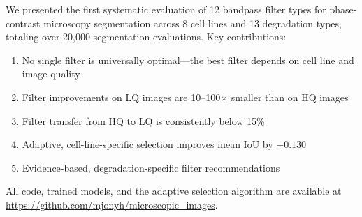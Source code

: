 \documentclass[11pt,a4paper]{article}
\begin{document}
We presented the first systematic evaluation of 12 bandpass filter types for phase-contrast microscopy segmentation across 8 cell lines and 13 degradation types, totaling over 20,000 segmentation evaluations. Key contributions:

\begin{enumerate}[nosep]
    \item No single filter is universally optimal---the best filter depends on cell line and image quality
    \item Filter improvements on LQ images are 10--100$\times$ smaller than on HQ images
    \item Filter transfer from HQ to LQ is consistently below 15\%
    \item Adaptive, cell-line-specific selection improves mean IoU by $+0.130$
    \item Evidence-based, degradation-specific filter recommendations
\end{enumerate}

All code, trained models, and the adaptive selection algorithm are available at \url{https://github.com/mjonyh/microscopic_images}.



\end{document}
